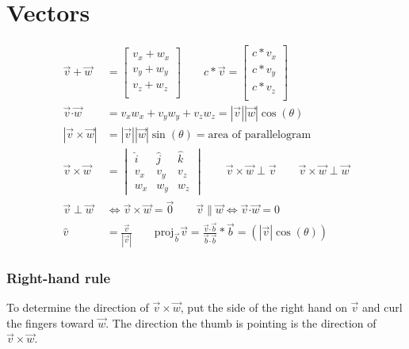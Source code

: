 \section{Vectors}
\newcommand{\dotp}{\boldsymbol{\cdot}}
\newcommand{\crossp}{\times}
\newcommand{\proj}{\text{proj}}

\[\begin{aligned}
	\vec{v} + \vec{w} &= \begin{bmatrix}
		v_x + w_x \\
		v_y + w_y \\
		v_z + w_z \\
	\end{bmatrix} \qquad
	c * \vec{v} = \begin{bmatrix}
		c * v_x \\
		c * v_y \\
		c * v_z \\
	\end{bmatrix} \\
	\vec{v} \dotp \vec{w} &= v_x w_x + v_y w_y + v_z w_z = |\vec{v}||\vec{w}| \cos(\theta) \\
	|\vec{v} \crossp \vec{w}| &= |\vec{v}||\vec{w}| \sin(\theta) = \text{area of parallelogram}\\
	\vec{v} \crossp \vec{w} &= \begin{vmatrix}
		\hat{i} & \hat{j} & \hat{k} \\
		v_x & v_y & v_z \\
		w_x & w_y & w_z
	\end{vmatrix} \qquad \vec{v} \crossp \vec{w} \perp \vec{v} \qquad \vec{v} \crossp \vec{w} \perp \vec{w} \\
	\vec{v} \perp \vec{w} &\iff \vec{v} \crossp \vec{w} = \vec{0} \qquad \vec{v} \parallel \vec{w} \iff \vec{v} \dotp \vec{w} = 0 \\
	\hat{v} &= \frac{\vec{v}}{|\vec{v}|} \qquad
	\text{proj}_{\vec{b}} \vec{v} = \frac{\vec{v} \dotp \vec{b}}{\vec{b} \dotp \vec{b}} * \vec{b} = (|\vec{v}| \cos(\theta))
\end{aligned}\]
\subsubsection{Right-hand rule}
To determine the direction of $\vec{v} \crossp \vec{w}$, put the side of the right hand on $\vec{v}$ and curl the fingers toward $\vec{w}$. The direction the thumb is pointing is the direction of $\vec{v} \crossp \vec{w}$.

